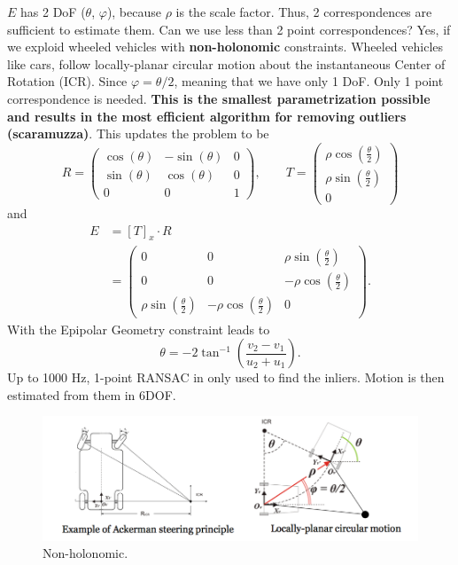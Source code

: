 \documentclass[a4paper,12 pt]{article}
\theoremstyle{definition}
\theoremstyle{remark}
\theoremstyle{definition}
\theoremstyle{definition}
\theoremstyle{definition}
\theoremstyle{remark}
\theoremstyle{definition}
\begin{document}
$E$ has 2 DoF ($\theta$, $\varphi$), because $\rho$ is the scale factor. Thus, 2 correspondences are sufficient to estimate them. Can we use less than 2 point correspondences? Yes, if we exploid wheeled vehicles with \textbf{non-holonomic} constraints. Wheeled vehicles like cars, follow locally-planar circular motion about the instantaneous Center of Rotation (ICR). Since $\varphi=\theta/2$, meaning that we have only 1 DoF. Only 1 point correspondence is needed. \textbf{This is the smallest parametrization possible and results in the most efficient algorithm for removing outliers (scaramuzza)}. This updates the problem to be
\begin{equation}
R=\begin{pmatrix}
\cos(\theta)&-\sin(\theta)&0\\
\sin(\theta)&\cos(\theta)&0\\
0&0&1
\end{pmatrix}, \qquad T=\begin{pmatrix}
\rho \cos(\frac{\theta}{2})\\
\rho \sin(\frac{\theta}{2})\\
0
\end{pmatrix}
\end{equation}
and
\begin{equation}
\begin{split}
E&=[T]_x\cdot R\\
&=\begin{pmatrix}
0&0&\rho \sin(\frac{\theta}{2})\\
0&0&-\rho \cos(\frac{\theta}{2})\\
\rho \sin(\frac{\theta}{2})&-\rho\cos(\frac{\theta}{2})&0
\end{pmatrix}.
\end{split}
\end{equation}
With the Epipolar Geometry constraint leads to
\begin{equation}
\theta = -2 \tan^{-1}\left(\frac{v_2-v_1}{u_2+u_1} \right).
\end{equation}
Up to 1000 Hz, 1-point RANSAC in only used to find the inliers. Motion is then estimated from them in 6DOF.
\begin{figure}[h!]
\begin{center}
\includegraphics[scale=0.4]{pics/holonomic}
\caption{Non-holonomic. \label{fig:holonomic}}
\end{center}
\end{figure}
\newpage
\end{document}
